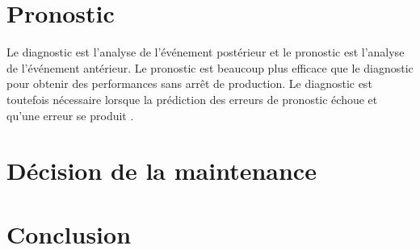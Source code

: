 \section{Pronostic}

Le diagnostic est l'analyse de l'événement postérieur et le pronostic est l'analyse de l'événement antérieur. Le pronostic est beaucoup plus efficace que le diagnostic pour obtenir des performances sans arrêt de production. Le diagnostic est toutefois nécessaire lorsque la prédiction des erreurs de pronostic échoue et qu'une erreur se produit \cite{Jardine2006}.

\section{Décision de la maintenance}

\section{Conclusion}
